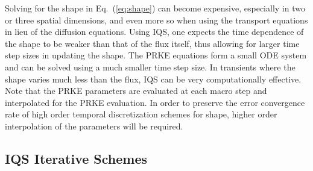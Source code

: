 \documentclass{elsarticle}
\newcommand{\eqt}[1]{Eq.~(\ref{#1})}                     %
\newcommand{\fig}[1]{Fig.~\ref{#1}}                      %
\begin{document}
Solving for the shape in \eqt{eq:shape} can become expensive, especially in two or three spatial dimensions, and even more so when using 
the transport equations in lieu of the diffusion equations.  Using IQS, one expects the time dependence of the shape to be weaker than that 
of the flux itself, thus allowing for larger time step sizes in updating the shape. The PRKE equations form a small ODE system and can be 
solved using a much smaller time step size. In transients where the shape varies much less than the flux, IQS can be very computationally effective. 
%
Note that the PRKE parameters are evaluated at each macro step and interpolated for the PRKE evaluation. In order to preserve 
the error convergence rate of high order temporal discretization schemes for shape, higher order interpolation of the parameters will be required.

\subsection{IQS Iterative Schemes}
\label{sect:iter}
\end{document}
